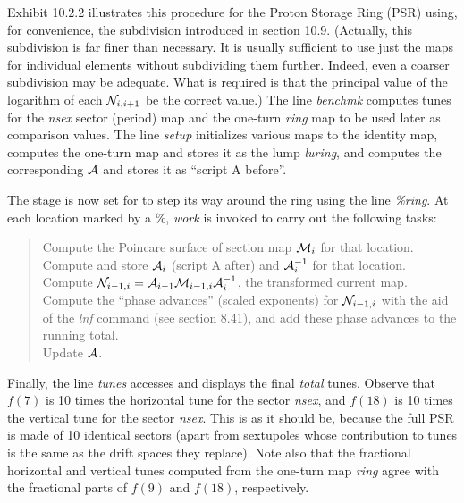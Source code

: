 Exhibit 10.2.2 illustrates this procedure for the Proton Storage Ring (PSR)
using, for convenience, the subdivision introduced in section 10.9.
(Actually, this subdivision is far finer than necessary.  It is usually
sufficient to use just the maps for individual elements without
subdividing them further.  Indeed, even a coarser subdivision may be
adequate.  What is required is that the principal value of the logarithm
of each ${\cal N}_{i,i+1}$ be the correct value.)  The line {\em
benchmk} computes tunes for the {\em nsex} sector (period) map and the
one-turn {\em ring} map to be used later as comparison values.  The line
{\em setup} initializes various maps to the identity map, computes the
one-turn map and stores it as the lump {\em luring}, and computes the
corresponding ${\cal A}$ and stores it as ``script A before''.

The stage is now set for \Mary to step its way around the ring using the
line {\em \%ring}.  At each location marked by a \%, {\em work} is invoked
to carry out the following tasks:
\begin{quote}
Compute the Poincare surface of section map ${\cal M}_i$ for that
location. \\

Compute and store ${\cal A}_i$ (script A after) and ${\cal A}^{-1}_i$ for
that location. \\

Compute ${\cal N}_{i-1,i} = {\cal A}_{i-1} {\cal M}_{i-1,i} {\cal
A}_i^{-1}$, the transformed current map. \\

Compute the ``phase advances'' (scaled exponents) for ${\cal N}_{i-1,i}$
with the aid of the {\em lnf} command (see section 8.41), and add these
phase advances to the running total.  \\

Update ${\cal A}$.
\end{quote}

Finally, the line {\em tunes} accesses and displays the final {\em total}
tunes.  Observe that $f(7)$ is 10 times the horizontal tune for the
sector {\em nsex}, and $f(18)$ is 10 times the vertical tune for the
sector {\em nsex}.  This is as it should be, because the full PSR is made
of 10 identical sectors (apart from sextupoles whose contribution to
tunes is the same as the drift spaces they replace).  Note also that the
fractional horizontal and vertical tunes computed from the one-turn map
{\em ring} agree with the fractional parts of $f(9)$ and $f(18)$,
respectively.

